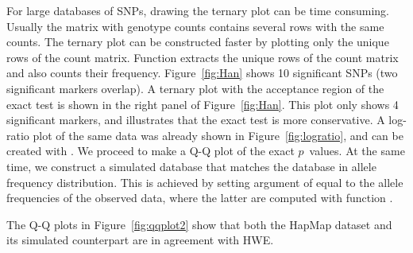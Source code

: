 \documentclass[nojss]{jss}
\begin{document}
%
For large databases of SNPs, drawing the ternary plot can be time
consuming. Usually the matrix with genotype counts contains several
rows with the same counts. The ternary plot can be constructed faster
by plotting only the unique rows of the count matrix. Function
 extracts the unique rows of the count
matrix and also counts their frequency. Figure~\ref{fig:Han} shows 10
significant SNPs (two significant markers overlap). A ternary plot
with the acceptance region of the exact test is shown in the right
panel of Figure~\ref{fig:Han}. This plot only shows 4 significant
markers, and illustrates that the exact test is more conservative. A
log-ratio plot of the same data was already shown in
Figure~\ref{fig:logratio}, and can be created with
. We proceed to make a Q-Q plot of the
exact $p$~values. At the same time, we construct a simulated database
that matches the  database in allele frequency
distribution. This is achieved by setting argument  of
 equal to the allele frequencies of the observed data,
where the latter are computed with function .
%

\begin{Schunk}
\end{Schunk}

The Q-Q plots in Figure~\ref{fig:qqplot2} show that both the HapMap
dataset and its simulated counterpart are in agreement with HWE.
\end{document}
